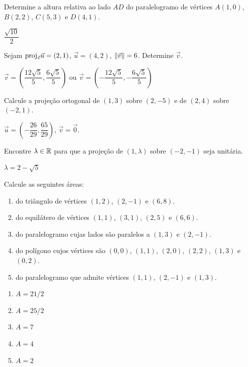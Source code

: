 \documentclass[12pt]{exam}
\begin{document}
\vspace{.3cm}

\questao{} Determine a altura relativa ao lado $AD$ do paralelogramo de vértices $A(1,0)$, $B(2,2)$, $C(5,3)$ e $D(4,1)$.
\begin{solucao}
    $\dfrac{\sqrt{10}}{2}$
\end{solucao}

\vspace{.3cm}

\questao{} Sejam ${\rm proj}_{\vec{v}}\vec{u} = (2, 1)$, $\vec{u} = (4,2)$, $\left\Vert{\vec{v}}\right\Vert = 6$. Determine $\vec{v}$.
\begin{solucao}
    $\vec{v} = \left(\dfrac{12\sqrt{5}}{5}, \dfrac{6\sqrt{5}}{5}\right)$ ou $\vec{v} = \left(-\dfrac{12\sqrt{5}}{5}, -\dfrac{6\sqrt{5}}{5}\right)$
\end{solucao}

\vspace{.3cm}

\questao{} Calcule a proje\c{c}ão ortogonal de $(1, 3)$ sobre $(2, -5)$ e de $(2, 4)$ sobre $(-2, 1)$.
\begin{solucao}
    $\vec{u} = \left(-\dfrac{26}{29}, \dfrac{65}{29}\right)$, $\vec{v} = \vec{0}$.
\end{solucao}

\vspace{.3cm}

\questao{} Encontre $\lambda \in \mathbb{R}$ para que a proje\c{c}ão de $(1, \lambda)$ sobre $(-2, -1)$ seja unitária.
\begin{solucao}
    $\lambda = 2 - \sqrt{5}$
\end{solucao}

\vspace{.3cm}

\questao{} Calcule as seguintes áreas:
\begin{enumerate}[label=({\alph*})]
    \item do triângulo de vértices $(1, 2)$, $(2, -1)$ e $(6, 8)$.
    \item do equilátero de vértices $(1, 1)$, $(3, 1)$, $(2, 5)$ e $(6, 6)$.
    \item do paralelogramo cujas lados são paralelos a $(1, 3)$ e $(2, -1)$.
    \item do polígono cujos vértices são $(0, 0)$, $(1, 1)$, $(2, 0)$, $(2, 2)$, $(1, 3)$ e $(0, 2)$.
    \item do paralelogramo que admite vértices $(1, 1)$, $(2, -1)$ e $(1, 3)$.
\end{enumerate}
\begin{solucao}
    \begin{enumerate}[label=({\alph*})]
        \item $A = 21/2$
        \item $A = 25/2$
        \item $A = 7$
        \item $A = 4$
        \item $A = 2$
    \end{enumerate}
\end{solucao}
\end{document}

